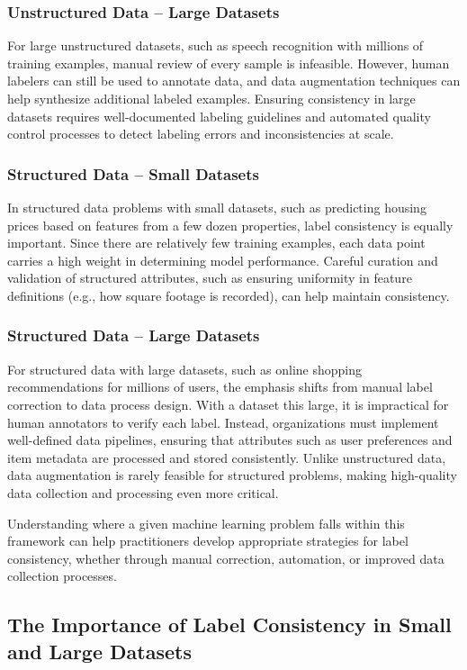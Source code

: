 \documentclass[12pt,openany, draft]{book}
\begin{document}
\subsubsection{Unstructured Data – Large Datasets}
For large unstructured datasets, such as speech recognition with millions of training examples, manual review of every sample is infeasible. However, human labelers can still be used to annotate data, and data augmentation techniques can help synthesize additional labeled examples. Ensuring consistency in large datasets requires well-documented labeling guidelines and automated quality control processes to detect labeling errors and inconsistencies at scale.

\subsubsection{Structured Data – Small Datasets}
In structured data problems with small datasets, such as predicting housing prices based on features from a few dozen properties, label consistency is equally important. Since there are relatively few training examples, each data point carries a high weight in determining model performance. Careful curation and validation of structured attributes, such as ensuring uniformity in feature definitions (e.g., how square footage is recorded), can help maintain consistency.

\subsubsection{Structured Data – Large Datasets}
For structured data with large datasets, such as online shopping recommendations for millions of users, the emphasis shifts from manual label correction to data process design. With a dataset this large, it is impractical for human annotators to verify each label. Instead, organizations must implement well-defined data pipelines, ensuring that attributes such as user preferences and item metadata are processed and stored consistently. Unlike unstructured data, data augmentation is rarely feasible for structured problems, making high-quality data collection and processing even more critical.

Understanding where a given machine learning problem falls within this framework can help practitioners develop appropriate strategies for label consistency, whether through manual correction, automation, or improved data collection processes.


\subsection{The Importance of Label Consistency in Small and Large Datasets}
\end{document}
